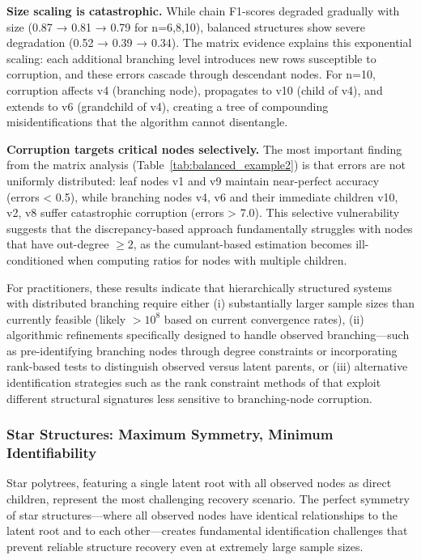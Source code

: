 \documentclass[11pt,a4paper]{article}
\numberwithin{equation}{section}
\begin{document}
\textbf{Size scaling is catastrophic.} While chain F1-scores degraded gradually with size (0.87 → 0.81 → 0.79 for n=6,8,10), balanced structures show severe degradation (0.52 → 0.39 → 0.34). The matrix evidence explains this exponential scaling: each additional branching level introduces new rows susceptible to corruption, and these errors cascade through descendant nodes. For n=10, corruption affects v4 (branching node), propagates to v10 (child of v4), and extends to v6 (grandchild of v4), creating a tree of compounding misidentifications that the algorithm cannot disentangle.

\textbf{Corruption targets critical nodes selectively.} The most important finding from the matrix analysis (Table~\ref{tab:balanced_example2}) is that errors are not uniformly distributed: leaf nodes v1 and v9 maintain near-perfect accuracy (errors < 0.5), while branching nodes v4, v6 and their immediate children v10, v2, v8 suffer catastrophic corruption (errors > 7.0). This selective vulnerability suggests that the discrepancy-based approach fundamentally struggles with nodes that have out-degree $\geq 2$, as the cumulant-based estimation becomes ill-conditioned when computing ratios for nodes with multiple children.

For practitioners, these results indicate that hierarchically structured systems with distributed branching require either (i) substantially larger sample sizes than currently feasible (likely $>10^8$ based on current convergence rates), (ii) algorithmic refinements specifically designed to handle observed branching—such as pre-identifying branching nodes through degree constraints or incorporating rank-based tests to distinguish observed versus latent parents, or (iii) alternative identification strategies such as the rank constraint methods of \citet{cai:etal:2024:rank} that exploit different structural signatures less sensitive to branching-node corruption.

\subsubsection{Star Structures: Maximum Symmetry, Minimum Identifiability}

Star polytrees, featuring a single latent root with all observed nodes as direct children, represent the most challenging recovery scenario. The perfect symmetry of star structures—where all observed nodes have identical relationships to the latent root and to each other—creates fundamental identification challenges that prevent reliable structure recovery even at extremely large sample sizes.
\end{document}
